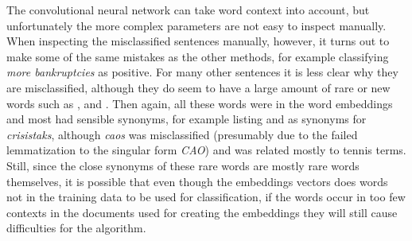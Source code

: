 The convolutional neural network can take word context into account, but unfortunately the more complex parameters are not easy to inspect manually. When inspecting the misclassified sentences manually, however, it turns out to make some of the same mistakes as the other methods, for example classifying \emph{more bankruptcies} as positive. For many other sentences it is less clear why they are misclassified, although they do seem to have a large amount of rare or new words such as ,  and . 
Then again, all these words were in the word embeddings and most had sensible synonyms, for example listing  and  as synonyms for \emph{crisistaks}, although \emph{caos} was misclassified 
(presumably due to the failed lemmatization to the singular form \emph{CAO}) and  was related mostly to tennis terms. 
Still, since the close synonyms of these rare words are mostly rare words themselves, it is possible that even though the embeddings vectors does words not in the training data to be used for classification, if the words occur in too few contexts in the documents used for creating the embeddings they will still cause difficulties for the algorithm. 


